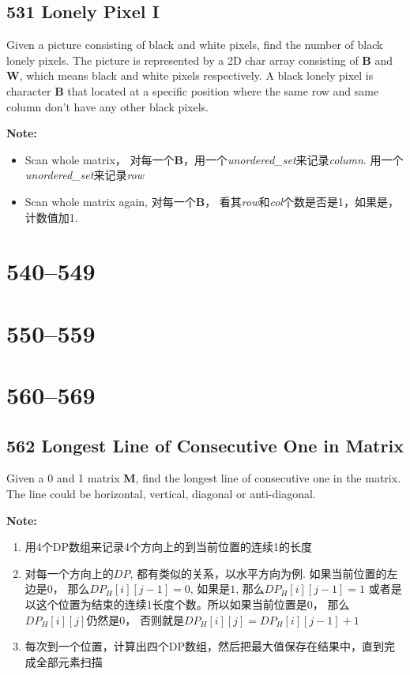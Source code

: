 \documentclass[a4paper,12pt]{article}
\begin{document}
	\subsection{531	Lonely Pixel I}
	Given a picture consisting of black and white pixels, find the number of black lonely pixels. The picture is represented by a 2D char array consisting of \textbf{B} and \textbf{W}, which means black and white pixels respectively. A black lonely pixel is character \textbf{B} that located at a specific position where the same row and same column don't have any other black pixels.
	\par
	\vspace{0.5em}
	\noindent
	\textbf{\large{Note:}}
	\begin{CJK*}{UTF8}{gbsn}
		\begin{itemize}
			\item Scan whole matrix， 对每一个\textbf{B}，用一个\textit{unordered\_set}来记录\textit{column}. 用一个\textit{unordered\_set}来记录\textit{row}
			\item Scan whole matrix again, 对每一个\textbf{B}， 看其\textit{row}和\textit{col}个数是否是1，如果是，计数值加1.
		\end{itemize}
		\clearpage\end{CJK*}
	
	\section{540--549}
	\section{550--559}
	\section{560--569}
	
	\subsection{562 Longest Line of Consecutive One in Matrix}
	Given a 0 and 1 matrix \textbf{M}, find the longest line of consecutive one in the matrix. The line could be horizontal, vertical, diagonal or anti-diagonal.
	\par
	\vspace{0.5em}
	\noindent
	\textbf{\large{Note:}}
	\begin{CJK*}{UTF8}{gbsn}
		\begin{enumerate}
			\item 用4个DP数组来记录4个方向上的到当前位置的连续1的长度
			\item 对每一个方向上的$DP$, 都有类似的关系，以水平方向为例. 如果当前位置的左边是$0$， 那么${DP_{H}[i][j-1]}=0$, 如果是$1$, 那么${DP_{H}[i][j-1]}=1$ 或者是以这个位置为结束的连续1长度个数。所以如果当前位置是$0$， 那么$DP_{H}[i][j]$仍然是$0$， 否则就是$DP_{H}[i][j] = DP_{H}[i][j-1]+1$
			\item 每次到一个位置，计算出四个DP数组，然后把最大值保存在结果中，直到完成全部元素扫描
		\end{enumerate}
		\clearpage\end{CJK*}
	
\end{document}
